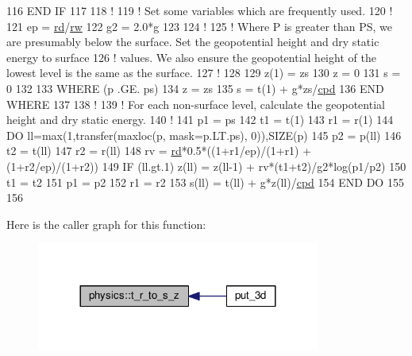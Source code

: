 \begin{DoxyCode}
116 \textcolor{keywordflow}{END IF}
117 
118 \textcolor{comment}{!}
119 \textcolor{comment}{! Set some variables which are frequently used.}
120 \textcolor{comment}{!}
121 ep  = \hyperlink{namespaceconstants_ad91564da82b97ea0d29ce0565565db85}{rd}/\hyperlink{namespaceconstants_a7ef8fc37397fbfbefd3c22883378dcc5}{rw}
122 g2  = 2.0*\hyperlink{namespaceconstants_a046aef138fbc8d05251d4fdc6eb3ee89}{g}
123 
124 \textcolor{comment}{!}
125 \textcolor{comment}{! Where P is greater than PS, we are presumably below the surface. Set the geopotential height and dry
       static energy to surface}
126 \textcolor{comment}{! values. We also ensure the geopotential height of the lowest level is the same as the surface.}
127 \textcolor{comment}{!}
128 
129 z(1)    = zs
130 z       = 0
131 s       = 0
132 
133 \textcolor{keywordflow}{WHERE} (p .GE. ps)
134     z   = zs
135     s   = t(1) + \hyperlink{namespaceconstants_a046aef138fbc8d05251d4fdc6eb3ee89}{g}*zs/\hyperlink{namespaceconstants_a32354adf3493f59d0fc17b0302b2c368}{cpd}
136 \textcolor{keywordflow}{END WHERE}
137 
138 \textcolor{comment}{!}
139 \textcolor{comment}{! For each non-surface level, calculate the geopotential height and dry static energy.}
140 \textcolor{comment}{!}
141 p1  = ps
142 t1  = t(1)
143 r1  = r(1)
144 \textcolor{keywordflow}{DO} ll=max(1,transfer(maxloc(p, mask=p.LT.ps), 0)),\textcolor{keyword}{SIZE}(p)
145     p2      = p(ll)
146     t2      = t(ll)
147     r2      = r(ll)
148     rv      = \hyperlink{namespaceconstants_ad91564da82b97ea0d29ce0565565db85}{rd}*0.5*((1+r1/ep)/(1+r1) + (1+r2/ep)/(1+r2))
149     \textcolor{keywordflow}{IF} (ll.gt.1)  z(ll)   = z(ll-1) + rv*(t1+t2)/g2*log(p1/p2)
150     t1      = t2
151     p1      = p2
152     r1      = r2
153     s(ll)   = t(ll) + \hyperlink{namespaceconstants_a046aef138fbc8d05251d4fdc6eb3ee89}{g}*z(ll)/\hyperlink{namespaceconstants_a32354adf3493f59d0fc17b0302b2c368}{cpd}
154 \textcolor{keywordflow}{END DO}
155 
156 
\end{DoxyCode}


Here is the caller graph for this function\+:\nopagebreak
\begin{figure}[H]
\begin{center}
\leavevmode
\includegraphics[width=264pt]{namespacephysics_aebc42cd426e3ef8e85696bb1c7da18c3_icgraph}
\end{center}
\end{figure}


